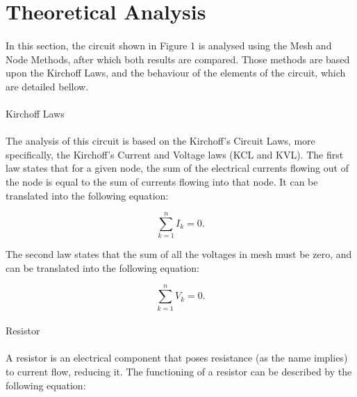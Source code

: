 \section{Theoretical Analysis}
\label{sec:analysis}

\paragraph{} In this section, the circuit shown in Figure 1 is analysed using the Mesh and Node Methods, after which both results are compared.
Those methods are based upon the Kirchoff Laws, and the behaviour of the elements of the circuit, which are detailed bellow.

\paragraph{} Kirchoff Laws

\paragraph{} The analysis of this circuit is based on the Kirchoff's Circuit Laws, more specifically, the Kirchoff's Current and Voltage laws (KCL and KVL). The first law states that for a given node, the sum of the electrical currents flowing out of the node is equal to the sum of currents flowing into that node. 
It can be translated into the following equation:

\begin{equation}
	\sum_{k = 1}^n I_k = 0.
	\label{eq:kcl}
\end{equation}

The second law states that the sum of all the voltages in mesh must be zero, and can be translated into the following equation:

\begin{equation}
	\sum_{k = 1}^n V_k = 0.
	\label{eq:kvl}
\end{equation}

\paragraph{}Resistor

\paragraph{}A resistor is an electrical component that poses resistance (as the name implies) to current flow, reducing it. The functioning of a resistor can be described
 by the following equation:

